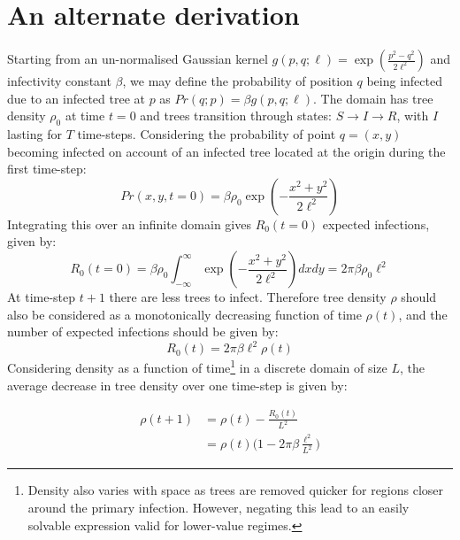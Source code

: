 \section{An alternate derivation}
Starting from an un-normalised Gaussian kernel $g(p, q; \ell) = \exp(\frac{p^2-q^2}{2\ell^2})$ and infectivity constant $\beta$, we may define the probability of position $q$ being infected due to an infected tree at $p$ as $Pr(q; p) = \beta g(p, q; \ell)$. The domain has tree density $\rho_0$ at time $t=0$ and trees transition through states: $S\rightarrow I\rightarrow R$, with $I$ lasting for $T$ time-steps. Considering the probability of point $q = (x, y)$ becoming infected on account of an infected tree located at the origin during the first time-step:
\begin{equation}
    Pr(x, y, t=0) = \beta \rho_0 \exp(-\frac{x^2+y^2}{2\ell^2})
\end{equation}{}
 Integrating this over an infinite domain gives $R_0(t=0)$ expected infections, given by:
\begin{equation}
    R_0(t = 0) = \beta \rho_0 \int^{\infty}_{-\infty} \exp(-\frac{x^2+y^2}{2\ell^2})dx dy= 2\pi\beta\rho_0\ell^2
\end{equation}{}
At time-step $t+1$ there are less trees to infect. Therefore tree density $\rho$ should also be considered as a monotonically decreasing function of time $\rho(t)$, and the number of expected infections should be given by:
\begin{equation}
    R_0(t) = 2\pi\beta\ell^2\rho(t)
    \label{eq:r0-A}
\end{equation}{}
 Considering density as a function of time\footnote{Density also varies with space as trees are removed quicker for regions closer around the primary infection. However, negating this lead to an easily solvable expression valid for lower-value regimes.} in a discrete domain of size $L$, the average decrease in tree density over one time-step is given by:

\begin{equation}
\label{eq:discrete-rho-t-A}
\begin{split}
\rho(t+1) & = \rho(t) - \frac{R_0(t)}{L^2} \\
 & = \rho(t)\Big(1 - 2\pi\beta\frac{\ell^2}{L^2} \Big)
\end{split}
\end{equation}

